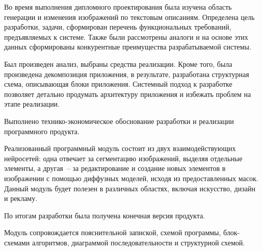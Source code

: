 \label{sec:outro}

Во время выполнения дипломного проектирования была изучена область генерации и изменения изображений по текстовым описаниям. Определена цель разработки, задачи, сформирован перечень 
функциональных требований, предъявляемых к системе. Также были рассмотрены аналоги и на основе этих данных сформированы конкурентные преимущества разрабатываемой системы.

Был произведен анализ, выбраны средства реализации. Кроме того, была произведена декомпозиция приложения, в результате, разработана структурная схема, описывающая блоки приложения. Системный подход к разработке позволяет детально продумать архитектуру приложения и избежать проблем на этапе реализации. 

Выполнено технико-экономическое обоснование разработки и реализации программного продукта.

Реализованный программный модуль состоит из двух взаимодействующих нейросетей: одна отвечает за сегментацию изображений, выделяя отдельные элементы, а другая~-- за редактирование и создание новых элементов в изображении с помощью диффузных моделей, исходя из предоставленных масок. Данный модуль будет полезен в различных областях, включая искусство, дизайн и рекламу.

По итогам разработки была получена конечная версия продукта.

Модуль сопровождается пояснительной запиской, схемой программы, блок-схемами алгоритмов, диаграммой последовательности и структурной схемой.

